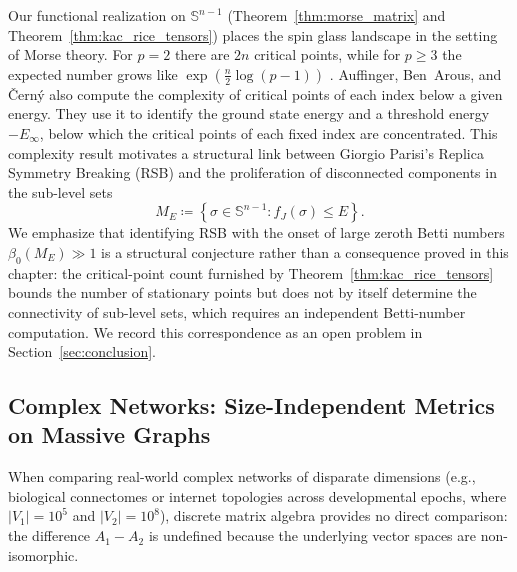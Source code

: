\documentclass[11pt,a4paper,reqno]{amsart}
\theoremstyle{definition}
\numberwithin{equation}{section}
\providecommand{\Sph}{\mathbb{S}}
\begin{document}
Our functional realization on $\Sph^{n-1}$ (Theorem~\ref{thm:morse_matrix} and Theorem~\ref{thm:kac_rice_tensors}) places the spin glass landscape in the setting of Morse theory. For $p = 2$ there are $2n$ critical points, while for $p \ge 3$ the expected number grows like $\exp(\frac{n}{2}\log(p-1))$ \cite{auffinger2013random}. Auffinger, Ben~Arous, and \v{C}ern\'y also compute the complexity of critical points of each index below a given energy. They use it to identify the ground state energy and a threshold energy $-E_\infty$, below which the critical points of each fixed index are concentrated. This complexity result motivates a structural link between Giorgio Parisi's Replica Symmetry Breaking (RSB) and the proliferation of disconnected components in the sub-level sets
\begin{equation}
    M_E \coloneqq \left\{ \sigma \in \Sph^{n-1} \colon f_J(\sigma) \le E \right\}.
\end{equation}
We emphasize that identifying RSB with the onset of large zeroth Betti numbers $\beta_0(M_E) \gg 1$ is a structural conjecture rather than a consequence proved in this chapter: the critical-point count furnished by Theorem~\ref{thm:kac_rice_tensors} bounds the number of stationary points but does not by itself determine the connectivity of sub-level sets, which requires an independent Betti-number computation. We record this correspondence as an open problem in Section~\ref{sec:conclusion}.

\subsection{Complex Networks: Size-Independent Metrics on Massive Graphs}
\label{subsec:imp_networks}
When comparing real-world complex networks of disparate dimensions (e.g., biological connectomes or internet topologies across developmental epochs, where $|V_1| = 10^5$ and $|V_2| = 10^8$), discrete matrix algebra provides no direct comparison: the difference $A_1 - A_2$ is undefined because the underlying vector spaces are non-isomorphic.
\end{document}
